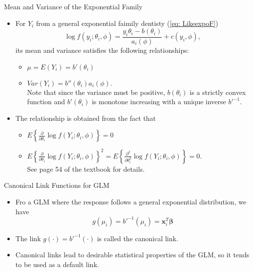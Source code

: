 \documentclass{beamer}
\begin{document}
    
    
     
        \begin{frame}{Mean and Variance of the Exponential Family}
        \begin{itemize}
            \item For $Y_{i}$ from a general exponential faimily dentisty (\ref{eq: LikeexpoF})
                $$\log f(y_{i};\theta_{i}, \phi) = \frac{y_{i}\theta_{i}-b(\theta_{i})}{a_{i}(\phi)} + c(y_{i}, \phi),$$
                its mean and variance satisfies the following relationships:
                \begin{itemize}
                    \item $\mu = E(Y_{i}) = b'(\theta_{i})$
                    \item $Var(Y_{i}) = b''(\theta_{i})a_{i}(\phi).$\\
                    Note that since the variance must be positive, $b(\theta_{i})$ is a strictly convex function and $b'(\theta_{i})$ is monotone increasing with a unique inverse $b'^{-1}$.
                \end{itemize}
            \item  The relationship is obtained from the fact that
            \begin{itemize}
                \item $E\left\{\frac{\partial}{\partial \theta_{i}}\log f(Y_{i}; \theta_{i}, \phi)\right\} = 0$
                \item $E\left\{\frac{\partial}{\partial \theta_{i}}\log f(Y_{i}; \theta_{i}, \phi)\right\}^2 = E\left\{\frac{\partial^2}{\partial \theta_{i}^2}\log f(Y_{i}; \theta_{i}, \phi)\right\} = 0.$\\
                See page 54 of the textbook for details.
            \end{itemize}
        \end{itemize}
        \end{frame}


     
        \begin{frame}{Canonical Link Functions for GLM}
        \begin{itemize}
            \item Fro a GLM where the response follows a general exponential distribution, we have
            $$g(\mu_{i}) = b'^{-1}(\mu_{i}) = \mathbf{x}^{T}_{i}\boldsymbol{\beta}$$
            \item The link $g(\cdot) = b'^{-1}(\cdot)$ is called the canonical link.
            \item Canonical links lead to desirable statistical properties of the GLM, so it tends to be used as a default link.  
            
        \end{itemize}
        \end{frame}
        
\end{document}
